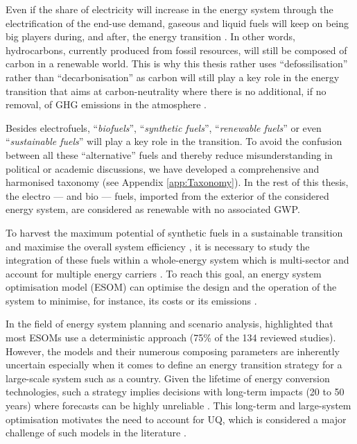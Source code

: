 \newpage
Even if the share of electricity will increase in the energy system through the electrification of the end-use demand, gaseous and liquid fuels will keep on being big players during, and after, the energy transition \cite{Ahlgren2012}. In other words, hydrocarbons, currently produced from fossil resources, will still be composed of carbon in a renewable world. This is why this thesis rather uses ``defossilisation'' rather than ``decarbonisation'' as carbon will still play a key role in the energy transition that aims at carbon-neutrality where there is no additional, if no removal, of \gls{GHG} emissions in the atmosphere \cite{mertens2020carbon}. 

Besides electrofuels, ``\emph{biofuels}'', ``\emph{synthetic fuels}'', ``\emph{renewable fuels}'' or even ``\emph{sustainable fuels}'' will play a key role in the transition. To avoid the confusion between all these ``alternative'' fuels and thereby reduce misunderstanding in political or academic discussions, we have developed a comprehensive and harmonised taxonomy (see Appendix \ref{app:Taxonomy}).  In the rest of this thesis, the electro --- and bio --- fuels, imported from the exterior of the considered energy system, are considered as renewable with no associated \gls{GWP}. 

To harvest the maximum potential of synthetic fuels in a sustainable transition and maximise the overall system efficiency \cite{mathiesen2015}, it is necessary to study the integration of these fuels within a whole-energy system which is multi-sector and account for multiple energy carriers \cite{contino2020whole}. To reach this goal, an energy system optimisation model (ESOM) can optimise the design and the operation of the system to minimise, for instance, its costs or its emissions \cite{zeng2011review}. 

In the field of energy system planning and scenario analysis, \citet{yue2018review} highlighted that most ESOMs use a deterministic approach (75\% of the 134 reviewed studies). However, the models and their numerous composing parameters are inherently uncertain especially when it comes to define an energy transition strategy for a large-scale system such as a country. Given the lifetime of energy conversion technologies, such a strategy implies decisions with long-term impacts (20 to 50 years) where forecasts can be highly unreliable \cite{Moret2017}. This long-term and large-system optimisation motivates the need to account for \gls{UQ}, which is considered a major challenge of such models in the literature \cite{pfenninger2014energy}. %

